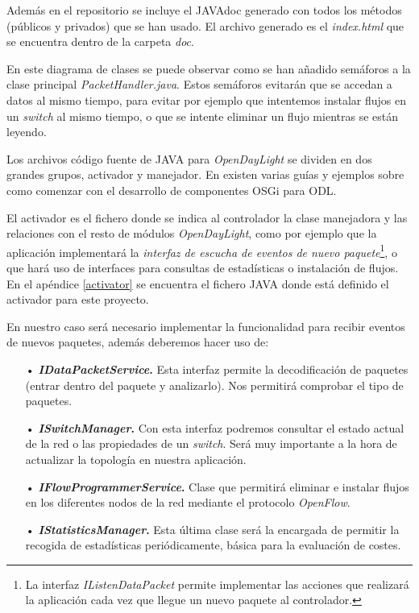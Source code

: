 \documentclass[a4paper,11pt]{book}
\begin{document}
Además en el repositorio se incluye el JAVAdoc generado con todos los métodos (públicos y privados) que se han usado. El archivo generado es el \textit{index.html} que se encuentra dentro de la carpeta \textit{doc}.

En este diagrama de clases se puede observar como se han añadido semáforos a la clase principal \textit{PacketHandler.java}. Estos semáforos evitarán que se accedan a datos al mismo tiempo, para evitar por ejemplo que intentemos instalar flujos en un \textit{switch} al mismo tiempo, o que se intente eliminar un flujo mientras se están leyendo.

Los archivos código fuente de JAVA para \emph{OpenDayLight} se dividen en dos grandes grupos, activador y manejador. En \cite{aprendiendoODL} existen varias guías y ejemplos sobre como comenzar con el desarrollo de componentes OSGi para \ac{ODL}.

El activador es el fichero donde se indica al controlador la clase manejadora y las relaciones con el resto de módulos \emph{OpenDayLight}, como por ejemplo que la aplicación implementará la \textit{interfaz de escucha de eventos de nuevo paquete}\footnote{La interfaz \textit{IListenDataPacket} permite implementar las acciones que realizará la aplicación cada vez que llegue un nuevo paquete al controlador.}, o que hará uso de interfaces para consultas de estadísticas o instalación de flujos. En el apéndice \ref{activator} se encuentra el fichero JAVA donde está definido el activador para este proyecto.

En nuestro caso será necesario implementar la funcionalidad para recibir eventos de nuevos paquetes, además deberemos hacer uso de:

\begin{itemize}
\item[•] \textbf{\textit{IDataPacketService}.} Esta interfaz permite la decodificación de paquetes (entrar dentro del paquete y analizarlo). Nos permitirá comprobar el tipo de paquetes.
\item[•] \textbf{\textit{ISwitchManager}.} Con esta interfaz podremos consultar el estado actual de la red o las propiedades de un \textit{switch}. Será muy importante a la hora de actualizar la topología en nuestra aplicación.
\item[•] \textbf{\textit{IFlowProgrammerService}.} Clase que permitirá eliminar e instalar flujos en los diferentes nodos de la red mediante el protocolo \emph{OpenFlow}.
\item[•] \textbf{\textit{IStatisticsManager}.} Esta última clase será la encargada de permitir la recogida de estadísticas periódicamente, básica para la evaluación de costes.
\end{itemize}
\end{document}
